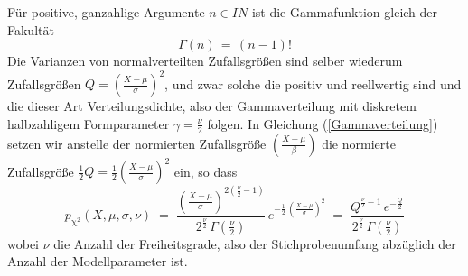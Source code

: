 Für positive, ganzahlige Argumente $n \in I \!\! N$ ist die Gammafunktion gleich der Fakultät
$$
\Gamma(n) \, = \, (n - 1)!
$$
Die Varianzen von normalverteilten Zufallsgrößen sind selber wiederum
Zufallsgrößen $Q = \left(\frac{X - \mu}{\sigma}\right)^2$,
und zwar solche die positiv und reellwertig sind und die dieser Art Verteilungsdichte,
also der Gammaverteilung mit diskretem halbzahligem Formparameter $\gamma = \frac{\nu}{2}$ folgen.
In Gleichung (\ref{Gammaverteilung}) setzen wir anstelle der normierten
Zufallsgröße $\left(\frac{X - \mu}{\beta}\right)$ die normierte Zufallsgröße
$\frac{1}{2} Q = \frac{1}{2} \left(\frac{X - \mu}{\sigma}\right)^2$ ein, so dass
\begin{equation}
p_\mathrm{\chi^2}(X, \mu, \sigma, \nu) \; = \;
\frac{\left(\frac{X - \mu}{\sigma}\right)^{2 (\frac{\nu}{2} - 1) }}{2^{\frac{\nu}{2}} \, \Gamma(\frac{\nu}{2})}\,
 e^{-\frac{1}{2} \, \left(\frac{X - \mu}{\sigma}\right)^2}
 \; = \; \frac{Q^{\frac{\nu}{2} - 1} \,
  e^{-\frac{Q}{2}}}{2^{\frac{\nu}{2}} \, \Gamma(\frac{\nu}{2})}
\label{Chi2pdfgamma}
\end{equation}
wobei $\nu$ die Anzahl der Freiheitsgrade, also der Stichprobenumfang abzüglich der Anzahl der
Modellparameter ist.





